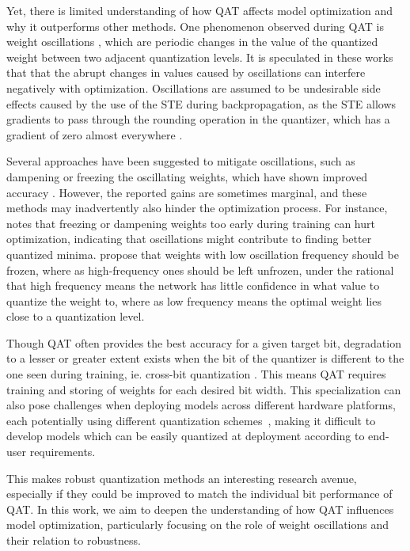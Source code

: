 Yet, there is limited understanding of how QAT affects model optimization and why it outperforms other methods. One phenomenon observed during QAT is weight oscillations \cite{pseudoQuantNoise, nagel2022overcoming}, which are periodic changes in the value of the quantized weight between two adjacent quantization levels. It is speculated in these works that that the abrupt changes in values caused by oscillations can interfere negatively with optimization. Oscillations are assumed to be undesirable side effects caused by the use of the STE during backpropagation, as the STE allows gradients to pass through the rounding operation in the quantizer, which has a gradient of zero almost everywhere \cite{pseudoQuantNoise, nagel2022overcoming}.

Several approaches have been suggested to mitigate oscillations, such as dampening or freezing the oscillating weights, which have shown improved accuracy \cite{nagel2022overcoming, gupta2023reducing}. However, the reported gains are sometimes marginal, and these methods may inadvertently also hinder the optimization process. For instance, \citet{nagel2022overcoming} notes that freezing or dampening weights too early during training can hurt optimization, indicating that oscillations might contribute to finding better quantized minima. \citet{vitoscillations} propose that weights with low oscillation frequency should be frozen, where as high-frequency ones should be left unfrozen, under the rational that high frequency means the network has little confidence in what value to quantize the weight to, where as low frequency means the optimal weight lies close to a quantization level.

Though QAT often provides the best accuracy for a given target bit, degradation to a lesser or greater extent exists when the bit of the quantizer is different to the one seen during training, ie. cross-bit quantization \cite{alizadeh2020gradient, OneModelRobust}. This means QAT requires training and storing of weights for each desired bit width. This specialization can also pose challenges when deploying models across different hardware platforms, each potentially using different quantization schemes~\cite{inferenceBenchmark}, making it difficult to develop models which can be easily quantized at deployment according to end-user requirements.

This makes robust quantization methods an interesting research avenue, especially if they could be improved to match the individual bit performance of QAT. In this work, we aim to deepen the understanding of how QAT influences model optimization, particularly focusing on the role of weight oscillations and their relation to robustness.